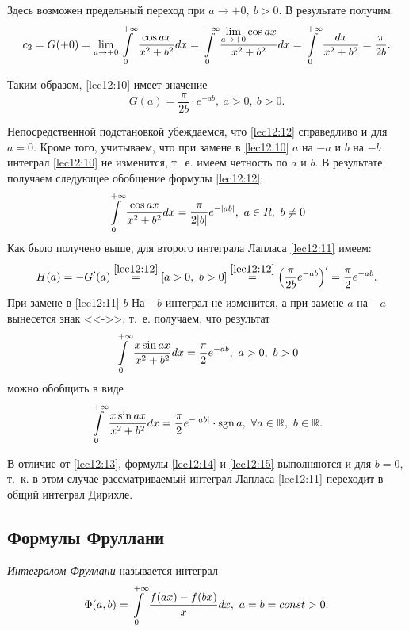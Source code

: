 \documentclass[../../main.tex]{subfiles}
\begin{document}
Здесь возможен предельный переход при $a \to +0,\ b > 0$. В результате получим:
\[c_2 = G(+0) = \lim_{a\to+0} \int\limits_{0}^{+\infty} \frac{\cos ax}{x^2 + b^2}dx = \int\limits_{0}^{+\infty} \frac{\lim\limits_{a\to+0} \cos ax}{x^2 + b^2}dx = \int\limits_{0}^{+\infty} \frac{dx}{x^2 + b^2} = \frac{\pi}{2b}.\]

Таким образом, \eqref{lec12:10} имеет значение
\begin{equation}
G(a) = \frac\pi{2b}\cdot e^{-ab},\ a > 0,\ b > 0.
\label{lec12:12}
\end{equation}

Непосредственной подстановкой убеждаемся, что \eqref{lec12:12} справедливо и для $a=0$. Кроме того, учитываем, что при замене в \eqref{lec12:10} $a$ на $-a$ и $b$ на $-b$ интеграл \eqref{lec12:10} не изменится, т.~е. имеем четность по $a$ и $b$. В результате получаем следующее обобщение формулы \eqref{lec12:12}:
\begin{equation}
\int\limits_{0}^{+\infty} \frac{\cos ax}{x^2 + b^2}dx = \frac{\pi}{2|b|} e^{-|ab|},\ a \in R,\ b \ne 0
\label{lec12:13}
\end{equation}
Как было получено выше, для второго интеграла Лапласа \eqref{lec12:11} имеем:
\[H(a) = -G'(a) \stk{lec12:12}= [a > 0,\ b > 0] \stk{lec12:12}= \left(\frac\pi{2b} e^{-ab}\right)' = \frac\pi2 e^{-ab}.\]
При замене в \eqref{lec12:11} $b$ На $-b$ интеграл не изменится, а при замене $a$ на $-a$ вынесется знак <<->>, т.~е. получаем, что результат
\begin{equation}
\int\limits_{0}^{+\infty} \frac{x\sin ax}{x^2 + b^2} dx = \frac{\pi}2 e^{-ab},\ a > 0,\ b > 0
\label{lec12:14}
\end{equation}
можно обобщить в виде
\begin{equation}
\int\limits_{0}^{+\infty} \frac{x\sin ax}{x^2 + b^2} dx = \frac\pi2 e^{-|ab|}\cdot\operatorname{sgn} a,\ \forall a \in \mathbb{R},\ b \in \mathbb{R}.
\label{lec12:15}
\end{equation}

В отличие от \eqref{lec12:13}, формулы \eqref{lec12:14} и \eqref{lec12:15} выполняются и для $b = 0$, т.~к. в этом случае рассматриваемый интеграл Лапласа \eqref{lec12:11} переходит в общий интеграл Дирихле. 

\subsection{Формулы Фруллани}

\emph{Интегралом Фруллани} называется интеграл
\begin{equation}
\Phi(a, b) = \ioinf \frac{f(ax) - f(bx)}{x} dx,\ a = b = const > 0.
\label{lec12:16}
\end{equation}
\end{document}
